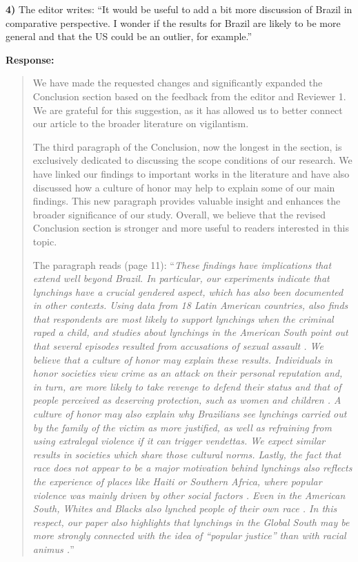 \documentclass[a4paper,12pt]{article}
\begin{document}
\vspace{.3cm}

\noindent \textbf{4)} The editor writes: ``It would be useful to add a bit more
discussion of Brazil in comparative perspective. I wonder if the results for
Brazil are likely to be more general and that the US could be an outlier, for
example.''

\vspace{.3cm}

\noindent \textbf{Response:} 
\begin{quote}

We have made the requested changes and significantly expanded the Conclusion
section based on the feedback from the editor and Reviewer 1. We are grateful
for this suggestion, as it has allowed us to better connect our article to the
broader literature on vigilantism.

The third paragraph of the Conclusion, now the longest in the section, is
exclusively dedicated to discussing the scope conditions of our research. We
have linked our findings to important works in the literature and have also
discussed how a culture of honor may help to explain some of our main findings.
This new paragraph provides valuable insight and enhances the broader
significance of our study. Overall, we believe that the revised Conclusion
section is stronger and more useful to readers interested in this topic.

The paragraph reads (page 11): ``\textit{These findings have implications that
  extend well beyond Brazil. In particular, our experiments indicate that
  lynchings have a crucial gendered aspect, which has also been documented in
  other contexts. Using data from 18 Latin American countries,
  \citet{nivette2016institutional} also finds that respondents are most likely
  to support lynchings when the criminal raped a child, and studies about
  lynchings in the American South point out that several episodes resulted from
  accusations of sexual assault \citep{jacquet2013giles, smaangs2020race}. We
  believe that a culture of honor may explain these results. Individuals in
  honor societies view crime as an attack on their personal reputation and, in
  turn, are more likely to take revenge to defend their status and that of
  people perceived as deserving protection, such as women and children
  \citep{nisbett2018culture}. A culture of honor may also explain why
  Brazilians see lynchings carried out by the family of the victim as more
  justified, as well as refraining from using extralegal violence if it can
  trigger vendettas. We expect similar results in societies which share those
  cultural norms. Lastly, the fact that race does not appear to be a major
  motivation behind lynchings also reflects the experience of places like Haiti
  or Southern Africa, where popular violence was mainly driven by other social
  factors \citep{berg2011globalizing, jung2020lynching}. Even in the American
  South, Whites and Blacks also lynched people of their own race
  \citep{beck1997race}. In this respect, our paper also highlights that
lynchings in the Global South may be more strongly connected with the idea of
``popular justice'' than with racial animus \citep{martins2015linchamentos}.}''


\end{quote}
\end{document}
